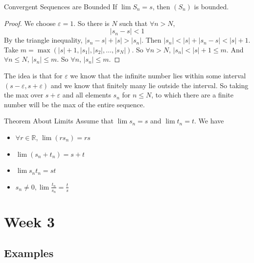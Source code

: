 \documentclass{report}
\begin{document}
\begin{theorem}{Convergent Sequences are Bounded}
    If $\lim S_{n} = s$, then $(S_{n})$ is bounded.
\end{theorem}
    \begin{proof}
        We choose $\varepsilon = 1$. So there is $N$ such that $\forall n > N$, 
            \begin{equation*}
                \lvert s_{n} - s \rvert < 1
            \end{equation*}
        By the triangle inequality, $\lvert s_{n} - s \rvert + \lvert s \rvert > \lvert s_{n} \rvert$. Then $\lvert s_{n} \rvert < \lvert s \rvert + \lvert s_{n} - s \rvert < \lvert s \rvert + 1$. Take $m = \max(\lvert s \rvert + 1, \lvert s_{1} \rvert, \lvert s_{2}\rvert, \ldots, \lvert s_{N} \rvert)$. So $\forall n > N$, $\lvert s_{n} \rvert < \lvert s \rvert + 1 \leq m$. And $\forall n \leq N$, $\lvert s_{n} \rvert \leq m$. So $\forall n$, $\lvert s_{n} \rvert \leq m$.
    \end{proof}
The idea is that for $\varepsilon$ we know that the infinite number lies within some interval $(s - \varepsilon, s + \varepsilon)$ and we know that finitely many lie outside the interval. So taking the max over $s + \varepsilon$ and all elements $s_{n}$ for $n \leq N$, to which there are a finite number will be the max of the entire sequence.

\begin{theorem}{Theorem About Limits}
    Assume that $\lim s_{n} = s$ and $\lim t_{n} = t$. We have
        \begin{itemize}
            \item  $\forall r \in \mathbb{R}$, $\lim (rs_{n}) = rs$

            \item  $\lim (s_{n} + t_{n}) = s + t$

            \item $\lim s_{n}t_{n} = st$

            \item $s_{n} \neq 0, \lim \frac{t_{n}}{s_{n}} = \frac{t}{s}$
        \end{itemize}
\end{theorem}

\chapter{Week 3}

\begin{topic}
    \section{Examples}
\end{topic}
\end{document}
